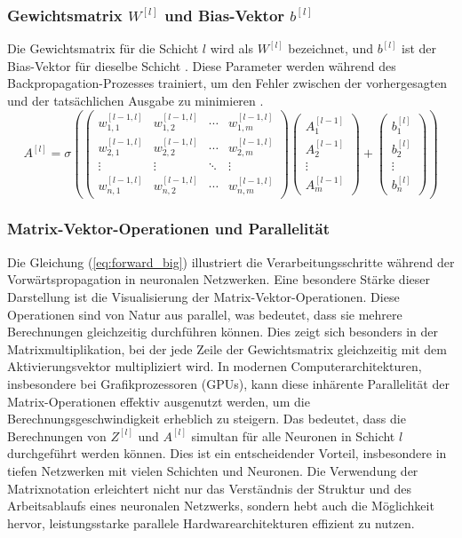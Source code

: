 \subsubsection{Gewichtsmatrix \( W^{[l]} \) und Bias-Vektor \( b^{[l]} \)}
Die Gewichtsmatrix für die Schicht \( l \) wird als \( W^{[l]} \) bezeichnet, und \( b^{[l]} \) ist der Bias-Vektor für dieselbe Schicht \cite{heaton_2012}. 
Diese Parameter werden während des Backpropagation-Prozesses trainiert, um den Fehler zwischen der vorhergesagten und der tatsächlichen Ausgabe zu minimieren \cite{aggarwal_neural_networks_2018}.
%
\begin{equation}
A^{[l]} = \sigma \left( 
\begin{pmatrix}
w_{1,1}^{[l-1,l]} & w_{1,2}^{[l-1,l]} & \cdots & w_{1,m}^{[l-1,l]} \\
w_{2,1}^{[l-1,l]} & w_{2,2}^{[l-1,l]} & \cdots & w_{2,m}^{[l-1,l]} \\
\vdots & \vdots & \ddots & \vdots \\
w_{n,1}^{[l-1,l]} & w_{n,2}^{[l-1,l]} & \cdots & w_{n,m}^{[l-1,l]}
\end{pmatrix}
\begin{pmatrix}
A_1^{[l-1]} \\
A_2^{[l-1]} \\
\vdots \\
A_m^{[l-1]}
\end{pmatrix}
+
\begin{pmatrix}
b_1^{[l]} \\
b_2^{[l]} \\
\vdots \\
b_n^{[l]}
\end{pmatrix}
\right)
	\label{eq:forward_big}
\end{equation}
%
\subsubsection{Matrix-Vektor-Operationen und Parallelität}
%
Die Gleichung (\ref{eq:forward_big}) illustriert die Verarbeitungsschritte während der Vorwärtspropagation in neuronalen Netzwerken. 
Eine besondere Stärke dieser Darstellung ist die Visualisierung der Matrix-Vektor-Operationen. 
Diese Operationen sind von Natur aus parallel, was bedeutet, dass sie mehrere Berechnungen gleichzeitig durchführen können. 
Dies zeigt sich besonders in der Matrixmultiplikation, bei der jede Zeile der Gewichtsmatrix gleichzeitig mit dem Aktivierungsvektor multipliziert wird.
%
In modernen Computerarchitekturen, insbesondere bei Grafikprozessoren (GPUs), kann diese inhärente Parallelität der Matrix-Operationen effektiv ausgenutzt werden, um die Berechnungsgeschwindigkeit erheblich zu steigern. 
Das bedeutet, dass die Berechnungen von \( Z^{[l]} \) und \( A^{[l]} \) simultan für alle Neuronen in Schicht \( l \) durchgeführt werden können. Dies ist ein entscheidender Vorteil, insbesondere in tiefen Netzwerken mit vielen Schichten und Neuronen.
%
Die Verwendung der Matrixnotation erleichtert nicht nur das Verständnis der Struktur und des Arbeitsablaufs eines neuronalen Netzwerks, sondern hebt auch die Möglichkeit hervor, leistungsstarke parallele Hardwarearchitekturen effizient zu nutzen.
%
%
